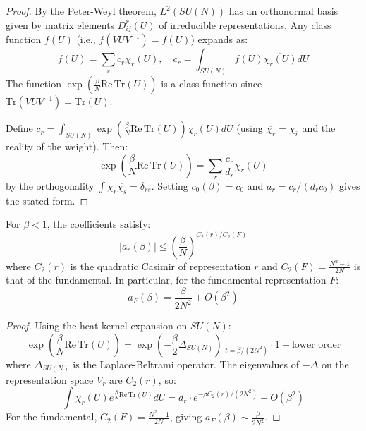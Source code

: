 \begin{proof}
By the Peter-Weyl theorem, $L^2(SU(N))$ has an orthonormal basis given by matrix elements $D^r_{ij}(U)$ of irreducible representations. Any class function $f(U)$ (i.e., $f(VUV^{-1}) = f(U)$) expands as:
\begin{equation}
f(U) = \sum_r c_r \chi_r(U), \quad c_r = \int_{SU(N)} f(U) \overline{\chi_r(U)} dU
\end{equation}
The function $\exp\left(\frac{\beta}{N}\mathrm{Re}\,\mathrm{Tr}(U)\right)$ is a class function since $\mathrm{Tr}(VUV^{-1}) = \mathrm{Tr}(U)$.

Define $c_r = \int_{SU(N)} \exp\left(\frac{\beta}{N}\mathrm{Re}\,\mathrm{Tr}(U)\right) \chi_r(U) dU$ (using $\overline{\chi_r} = \chi_{\bar{r}}$ and the reality of the weight). Then:
\begin{equation}
\exp\left(\frac{\beta}{N}\mathrm{Re}\,\mathrm{Tr}(U)\right) = \sum_r \frac{c_r}{d_r} \chi_r(U)
\end{equation}
by the orthogonality $\int \chi_r \overline{\chi_s} = \delta_{rs}$. Setting $c_0(\beta) = c_0$ and $a_r = c_r/(d_r c_0)$ gives the stated form.
\end{proof}

\begin{lemma}
\label{lem:character_bounds}
For $\beta < 1$, the coefficients satisfy:
\begin{equation}
|a_r(\beta)| \leq \left(\frac{\beta}{N}\right)^{C_2(r)/C_2(F)}
\end{equation}
where $C_2(r)$ is the quadratic Casimir of representation $r$ and $C_2(F) = \frac{N^2-1}{2N}$ is that of the fundamental. In particular, for the fundamental representation $F$:
\begin{equation}
a_F(\beta) = \frac{\beta}{2N^2} + O(\beta^2)
\end{equation}
\end{lemma}

\begin{proof}
Using the heat kernel expansion on $SU(N)$:
\begin{equation}
\exp\left(\frac{\beta}{N}\mathrm{Re}\,\mathrm{Tr}(U)\right) = \exp\left(-\frac{\beta}{2}\Delta_{SU(N)}\right)\Big|_{t=\beta/(2N^2)} \cdot 1 + \text{lower order}
\end{equation}
where $\Delta_{SU(N)}$ is the Laplace-Beltrami operator. The eigenvalues of $-\Delta$ on the representation space $V_r$ are $C_2(r)$, so:
\begin{equation}
\int \chi_r(U) e^{\frac{\beta}{N}\mathrm{Re}\,\mathrm{Tr}(U)} dU = d_r \cdot e^{-\beta C_2(r)/(2N^2)} + O(\beta^2)
\end{equation}
For the fundamental, $C_2(F) = \frac{N^2-1}{2N}$, giving $a_F(\beta) \sim \frac{\beta}{2N^2}$.
\end{proof}

